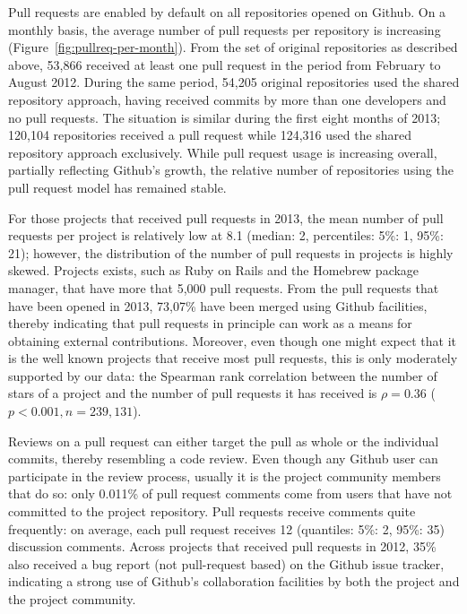 \documentclass{sig-alternate}
\begin{document}
Pull requests are enabled by default on all repositories opened on Github. On a
monthly basis, the average number of pull requests per repository is increasing
(Figure~\ref{fig:pullreq-per-month}). From the set of original repositories as
described above, 53,866 received at least one pull request in the period from
February to August 2012. During the
same period, 54,205 original repositories used the shared repository approach,
having received commits by more than one developers and no pull requests. The
situation is similar during the first eight months of 2013; 120,104 repositories
received a pull request while 124,316 used the shared repository approach
exclusively. While pull request usage is increasing overall, partially
reflecting Github's growth, the relative
number of repositories using the pull request model has remained stable.

For those projects that received pull requests in 2013, the mean number of pull
requests per project is relatively low at 8.1 (median: 2, percentiles: 5\%: 1,
95\%: 21); however, the distribution of the number of pull requests in projects
is highly skewed.  Projects exists, such as Ruby on Rails and the Homebrew
package manager, that have more that 5,000 pull requests. From the pull requests
that have been opened in 2013, 73,07\% have been merged using Github facilities,
thereby indicating that pull requests in principle can work as a means for
obtaining external contributions. Moreover, even though one might expect that it
is the well known projects that receive most pull requests, this is only
moderately supported by our data: the Spearman rank correlation between the
number of stars of a project and the number of pull requests it has received is
$\rho = 0.36$ ($p < 0.001, n = 239,131$).

Reviews on a pull request can either target the pull as whole or the individual
commits, thereby resembling a code review. Even though any Github user can
participate in the review process, usually it is the project community members
that do so: only 0.011\% of pull request comments come from users that have not
committed to the project repository. Pull requests receive comments quite
frequently: on average, each pull request receives 12 (quantiles: 5\%: 2, 95\%:
35) discussion comments. Across projects that received pull
requests in 2012, 35\% also received a bug report (not pull-request based) 
on the Github issue tracker, indicating a strong use of Github's collaboration
facilities by both the project and the project community.
\end{document}
